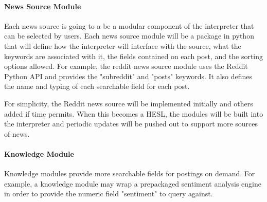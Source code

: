 \paragraph{News Source Module }

Each news source is going to a be a modular component of the interpreter that can be selected by users. Each news source module will be a package in python that will define how the interpreter will interface with the source, what the keywords are associated with it, the fields contained on each post, and the sorting options allowed. For example, the reddit news source module uses the Reddit Python API and provides the "subreddit" and "posts" keywords. It also defines the name and typing of each searchable  field for each post. 

For simplicity, the Reddit news source will be implemented initially and others added if time permits. When this becomes a HESL, the modules will be built into the interpreter and periodic updates will be pushed out to support more sources of news.\\


\paragraph{Knowledge Module}
Knowledge modules provide more searchable fields for postings on demand. For example, a knowledge module may wrap a prepackaged sentiment analysis engine in order to provide the numeric field "sentiment" to query against. 
